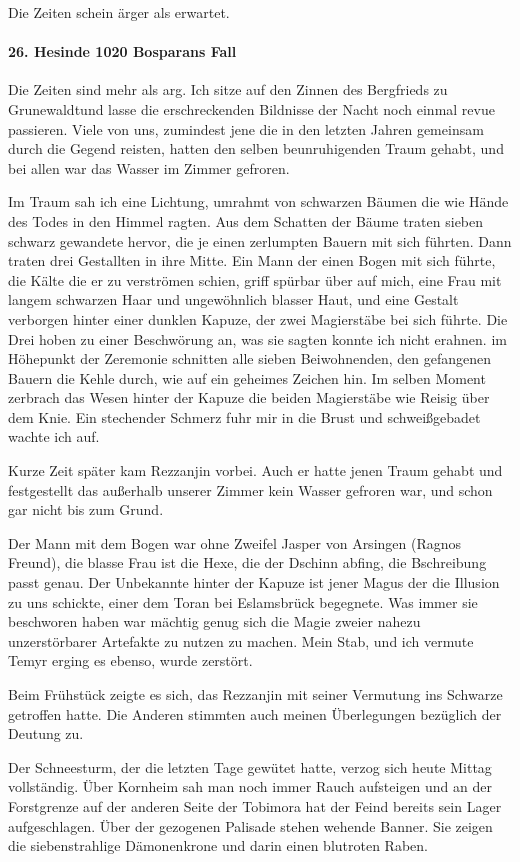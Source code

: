 Die Zeiten schein ärger als erwartet.

\paragraph{26. Hesinde 1020 Bosparans Fall}
Die Zeiten sind mehr als arg. Ich sitze auf den Zinnen des Bergfrieds zu Grunewaldtund lasse die erschreckenden Bildnisse der Nacht noch einmal revue passieren. Viele von uns, zumindest jene die in den letzten Jahren gemeinsam durch die Gegend reisten, hatten den selben beunruhigenden Traum gehabt, und bei allen war das Wasser im Zimmer gefroren.

Im Traum sah ich eine Lichtung, umrahmt von schwarzen Bäumen die wie Hände des Todes in den Himmel ragten. Aus dem Schatten der Bäume traten sieben schwarz gewandete hervor, die je einen zerlumpten Bauern mit sich führten. Dann traten drei Gestallten in ihre Mitte. Ein Mann der einen Bogen mit sich führte, die Kälte die er zu verströmen schien, griff spürbar über auf mich, eine Frau mit langem schwarzen Haar und ungewöhnlich blasser Haut, und eine Gestalt verborgen hinter einer dunklen Kapuze, der zwei Magierstäbe bei sich führte. Die Drei hoben zu einer Beschwörung an, was sie sagten konnte ich nicht erahnen. im Höhepunkt der Zeremonie schnitten alle sieben Beiwohnenden, den gefangenen Bauern die Kehle durch, wie auf ein geheimes Zeichen hin. Im selben Moment zerbrach das Wesen hinter der Kapuze die beiden Magierstäbe wie Reisig über dem Knie. Ein stechender Schmerz fuhr mir in die Brust und schweißgebadet wachte ich auf.

Kurze Zeit später kam Rezzanjin vorbei. Auch er hatte jenen Traum gehabt und festgestellt das außerhalb unserer Zimmer kein Wasser gefroren war, und schon gar nicht bis zum Grund.

Der Mann mit dem Bogen war ohne Zweifel Jasper von Arsingen (Ragnos Freund), die blasse Frau ist die Hexe, die der Dschinn abfing, die Bschreibung passt genau. Der Unbekannte hinter der Kapuze ist jener Magus der die Illusion zu uns schickte, einer dem Toran bei Eslamsbrück begegnete. Was immer sie beschworen haben war mächtig genug sich die Magie zweier nahezu unzerstörbarer Artefakte zu nutzen zu machen. Mein Stab, und ich vermute Temyr erging es ebenso, wurde zerstört.

Beim Frühstück zeigte es sich, das Rezzanjin mit seiner Vermutung ins Schwarze getroffen hatte. Die Anderen stimmten auch meinen Überlegungen bezüglich der Deutung zu.

Der Schneesturm, der die letzten Tage gewütet hatte, verzog sich heute Mittag vollständig. Über Kornheim sah man noch immer Rauch aufsteigen und an der Forstgrenze auf der anderen Seite der Tobimora hat der Feind bereits sein Lager aufgeschlagen. Über der gezogenen Palisade stehen wehende Banner. Sie zeigen die siebenstrahlige Dämonenkrone und darin einen blutroten Raben.


